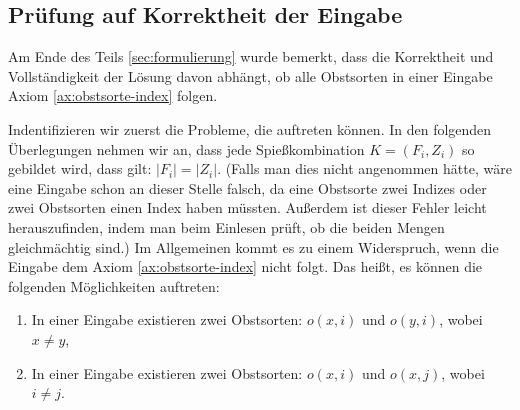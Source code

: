 \subsection{Prüfung auf Korrektheit der Eingabe}\label{sec:korrektheit-eingabe}
Am Ende des Teils \ref{sec:formulierung} wurde bemerkt, dass die Korrektheit und Vollständigkeit
der Lösung davon abhängt, ob alle Obstsorten in einer Eingabe Axiom \ref{ax:obstsorte-index} folgen.

Indentifizieren wir zuerst die Probleme, die auftreten können.
In den folgenden Überlegungen nehmen wir an, dass jede Spießkombination $K = (F_i, Z_i)$ so gebildet wird,
dass gilt: $|F_i| = |Z_i|$.
(Falls man dies nicht angenommen hätte, wäre eine Eingabe schon an dieser Stelle
falsch, da eine Obstsorte zwei Indizes oder zwei Obstsorten einen Index haben müssten.
Außerdem ist dieser Fehler leicht herauszufinden, indem man beim Einlesen prüft,
ob die beiden Mengen gleichmächtig sind.)
Im Allgemeinen kommt es zu einem Widerspruch, wenn die Eingabe
dem Axiom \ref{ax:obstsorte-index} nicht folgt. 
Das heißt, es können die folgenden 
Möglichkeiten auftreten:
\begin{enumerate}[label={(P\arabic*)}]
  \item In einer Eingabe existieren zwei Obstsorten: $o(x, i)$ und $o(y, i)$, wobei $x \neq y$,\label{probleme1}
  \item In einer Eingabe existieren zwei Obstsorten: $o(x, i)$ und $o(x, j)$, wobei $i \neq j$.\label{probleme2}
\end{enumerate}

